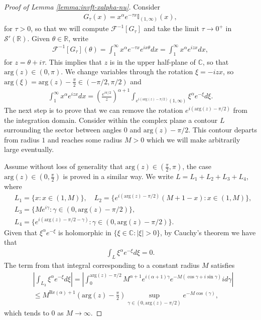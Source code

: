 \documentclass[a4paper, reqno, 11pt]{amsart}
\theoremstyle{definition}
\begin{document}
	\begin{proof}[Proof of Lemma \ref{lemma:invft-xalpha-nu}]
	Consider
	\begin{align*}
		G_{\tau}(x) = x^{\alpha} e^{-\tau x} \mathbb{I}_{(1,\infty)}(x),
	\end{align*}
	for $\tau > 0$, so that we will compute $\mathcal{F}^{-1}[G_{\tau}]$ and take the limit $\tau \rightarrow 0^+$ in $\mathcal{S}'(\mathbb{R})$. Given $\theta \in \mathbb{R}$, write
	\begin{align*}
		\mathcal{F}^{-1}[G_{\tau}](\theta) = \int_{1}^{\infty} x^{\alpha} e^{-\tau x} e^{ix\theta} dx = \int_{1}^{\infty} x^{\alpha} e^{i z x} dx, 
	\end{align*}
	for $z = \theta + i \tau$. This implies that $z$ is in the upper half-plane of $\mathbb{C}$, so that $\text{arg}(z) \in (0,\pi)$. We change variables through the rotation $\xi = - i z x$, so $\text{arg}(\xi) = \text{arg}(z)  - \frac{\pi}{2} \in (-\pi/2,\pi/2)$ and
	\begin{align*}						
		\int_{1}^{\infty} x^{\alpha} e^{i z x} dx = \left( \frac{e^{i\pi/2}}{z} \right)^{\alpha+1} \int_{e^{i(\text{arg}(z)-\pi/2)}(1,\infty)} \xi^{\alpha} e^{-\xi} d\xi.
	\end{align*}
	The next step is to prove that we can remove the rotation $e^{i(\text{arg}(z)-\pi/2)}$ from the integration domain. Consider within the complex plane a contour $L$ surrounding the sector between angles $0$ and $\text{arg}(z)-\pi/2$. This contour departs from radius $1$ and reaches some radius $M>0$ which we will make arbitrarily large eventually. 

Assume without loss of generality that $\text{arg}(z) \in (\frac{\pi}{2},\pi)$, the case $\text{arg}(z) \in (0,\frac{\pi}{2})$ is proved in a similar way. We write $L = L_1 + L_2 + L_3 + L_4$, where
		\begin{align*}
		&L_1 = \{ x : x \in (1,M) \}, \quad L_2 = \{ e^{i(\text{arg}(z)-\pi/2)}(M + 1 - x) : x \in (1,M) \}, \nonumber \\
			&L_3 = \{ M e^{i\gamma} : \gamma \in (0,\text{arg}(z)-\pi/2)\}, \nonumber \\
			& L_4 = \{e^{i(\text{arg}(z) - \pi/2-\gamma)} : \gamma \in (0,\text{arg}(z)-\pi/2)\}.
	\end{align*}
Given that $\xi^{\alpha} e^{-\xi}$ is holomorphic in $\{\xi \in \mathbb C : |\xi| > 0\}$, by Cauchy's theorem we have that
	\begin{align*}
		\int_L \xi^{\alpha} e^{-\xi} d\xi = 0.
	\end{align*}
	The term from that integral corresponding to a constant radius $M$ satisfies
	\begin{align*}
		&\left|\int_{L_3}\xi^{\alpha} e^{-\xi} d\xi \right| = \left| \int_0^{\text{arg}(z)-\pi/2} M^{\alpha+1} e^{i (\alpha + 1) \gamma} e^{-M(\cos \gamma + i \sin \gamma)} i d\gamma \right|  \nonumber\\
		&\leq M^{\text{Re}(\alpha) + 1} \left( \text{arg}(z)-\frac{\pi}{2} \right)\sup_{\gamma \in (0,\text{arg}(z)-\pi/2)} e^{- M \cos(\gamma)},
	\end{align*}
	which tends to $0$ as $M \rightarrow \infty$.
	 

\end{proof}
\end{document}
